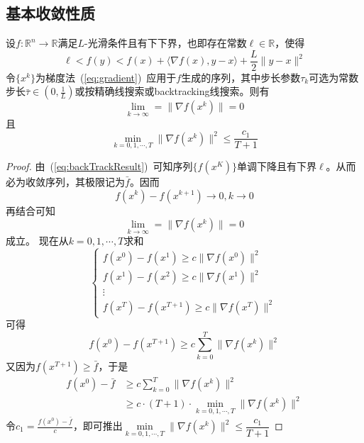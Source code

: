 \subsection{基本收敛性质}
\begin{theorem}
    设$f:\mathbb{R}^n\to \mathbb{R}$满足$L$-光滑条件且有下下界，也即存在常数$\ell \in \mathbb{R}$，使得
    \[
        \ell < f(y)< f(x) + \langle \nabla f(x), y-x \rangle + \dfrac{L}{2}\|y-x\|^2
    \]
    令$\{x^k\}$为梯度法~(\ref{eq:gradient})~应用于$f$生成的序列，其中步长参数$\tau_k$可选为常数步长$\bar{\tau}\in(0,\frac{1}{L})$或按精确线搜索或backtracking线搜索。则有
    \[
        \lim\limits_{k\to \infty} =\| \nabla f(x^k) \| = 0   
    \]
    且
    \[
        \min_{k = 0,1,\cdots,T}\| \nabla f(x^k) \|^2\leq \dfrac{c_1}{T+1}
    \]
\end{theorem}
\begin{proof}
    由~(\ref{eq:backTrackResult})~可知序列$\{ f(x^K) \}$单调下降且有下界$\ell$。从而必为收敛序列，其极限记为$\bar{f}$。因而
    \[
        f(x^k)-f(x^{k+1})\to 0, k\to 0
    \]
    再结合可知
    \[
        \lim\limits_{k\to \infty} =\| \nabla f(x^k) \| = 0   
    \]
    成立。
    现在从$k = 0,1,\cdots,T$求和
    \[
        \left\{
            \begin{array}{c}
                f(x^0) - f(x^{1})\geq c\|\nabla f(x^{0})\|^2\\
                f(x^1) - f(x^{2})\geq c\|\nabla f(x^{1})\|^2\\
                \vdots \\
                f(x^T) - f(x^{T+1})\geq c\|\nabla f(x^{T})\|^2
            \end{array}
        \right.
    \]
    可得
    \[
        f(x^0) - f(x^{T+1})\geq c\sum\limits_{k =0}^{T}\|\nabla f(x^{k})\|^2
    \]
    又因为$f(x^{T+1})\geq \bar{f}$，于是
    \[
        \begin{array}{ll}
            f(x^0)-\bar{f}& \geq c\sum\limits_{k = 0}^{T}\|\nabla f(x^{k})\|^2\\
            &\geq c\cdot (T+1)\cdot \min\limits_{k = 0,1,\cdots,T}\|\nabla f(x^k) \|^2
        \end{array}
    \]
    令$c_1=\frac{f(x^0)-\bar{f}}{c}$，即可推出$\min\limits_{k = 0,1,\cdots,T}\| \nabla f(x^k) \|^2\leq \dfrac{c_1}{T+1}$
\end{proof}